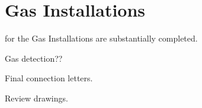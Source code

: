 \chapter{Gas Installations}


 for the Gas Installations are substantially completed.

Gas detection??

Final connection letters.

Review drawings.
